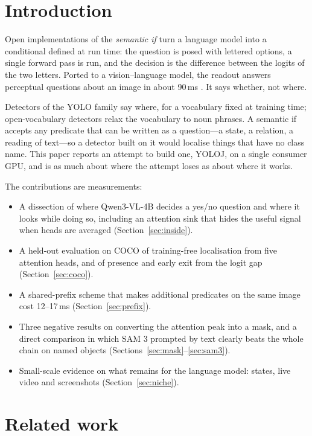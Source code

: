 \documentclass[10pt,twocolumn]{article}
\begin{document}
\section{Introduction}

Open implementations of the \emph{semantic if} \cite{semif,jevcpu} turn a
language model into a conditional defined at run time: the question is posed
with lettered options, a single forward pass is run, and the decision is the
difference between the logits of the two letters. Ported to a vision--language
model, the readout answers perceptual questions about an image in about
90\,ms \cite{discern}. It says whether, not where.

Detectors of the YOLO family \cite{redmon2016yolo} say where, for a vocabulary
fixed at training time; open-vocabulary detectors
\cite{cheng2024yoloworld,liu2024groundingdino} relax the vocabulary to noun
phrases. A semantic if accepts any predicate that can be written as a
question---a state, a relation, a reading of text---so a detector built on it
would localise things that have no class name. This paper reports an attempt
to build one, YOLOJ, on a single consumer GPU, and is as much about where the
attempt loses as about where it works.

The contributions are measurements:

\begin{itemize}\setlength{\itemsep}{0pt}
\item A dissection of where Qwen3-VL-4B decides a yes/no question and where it
looks while doing so, including an attention sink that hides the useful
signal when heads are averaged (Section~\ref{sec:inside}).
\item A held-out evaluation on COCO of training-free localisation from five
attention heads, and of presence and early exit from the logit gap
(Section~\ref{sec:coco}).
\item A shared-prefix scheme that makes additional predicates on the same
image cost 12--17\,ms (Section~\ref{sec:prefix}).
\item Three negative results on converting the attention peak into a mask,
and a direct comparison in which SAM 3 prompted by text clearly beats the
whole chain on named objects (Sections~\ref{sec:mask}--\ref{sec:sam3}).
\item Small-scale evidence on what remains for the language model: states,
live video and screenshots (Section~\ref{sec:niche}).
\end{itemize}

\section{Related work}
\end{document}
